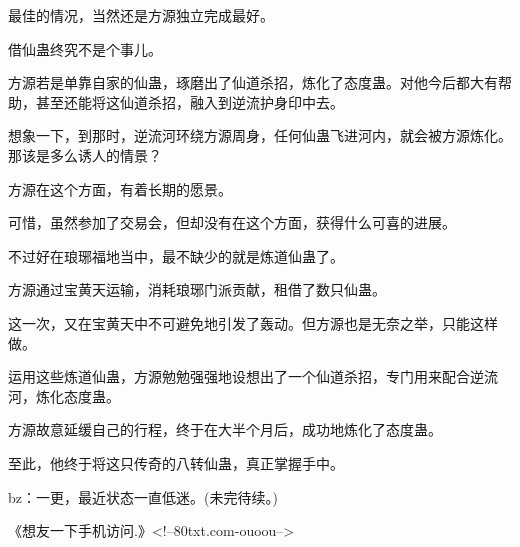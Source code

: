 \begin{this_body}
最佳的情况，当然还是方源独立完成最好。

借仙蛊终究不是个事儿。

方源若是单靠自家的仙蛊，琢磨出了仙道杀招，炼化了态度蛊。对他今后都大有帮助，甚至还能将这仙道杀招，融入到逆流护身印中去。

想象一下，到那时，逆流河环绕方源周身，任何仙蛊飞进河内，就会被方源炼化。那该是多么诱人的情景？

方源在这个方面，有着长期的愿景。

可惜，虽然参加了交易会，但却没有在这个方面，获得什么可喜的进展。

不过好在琅琊福地当中，最不缺少的就是炼道仙蛊了。

方源通过宝黄天运输，消耗琅琊门派贡献，租借了数只仙蛊。

这一次，又在宝黄天中不可避免地引发了轰动。但方源也是无奈之举，只能这样做。

运用这些炼道仙蛊，方源勉勉强强地设想出了一个仙道杀招，专门用来配合逆流河，炼化态度蛊。

方源故意延缓自己的行程，终于在大半个月后，成功地炼化了态度蛊。

至此，他终于将这只传奇的八转仙蛊，真正掌握手中。

bz：一更，最近状态一直低迷。(未完待续。)

《想友一下手机访问.》<!--80txt.com-ouoou-->

\end{this_body}

